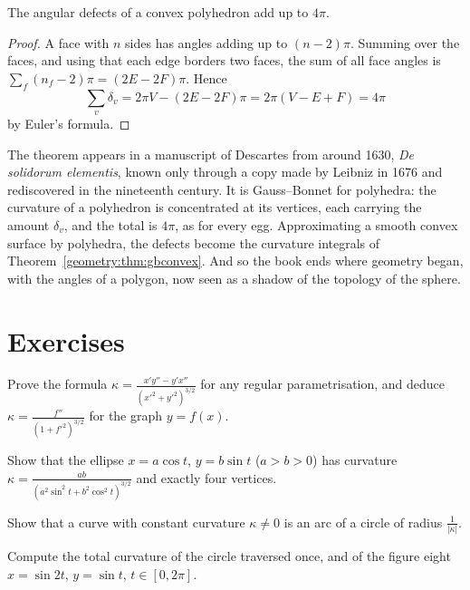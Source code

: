 \begin{theorem}[Descartes]\label{geometry:thm:descartesdefect}
The angular defects of a convex polyhedron add up to $4\pi$.
\end{theorem}

\begin{proof}
A face with $n$ sides has angles adding up to $(n-2)\pi$. Summing over the faces, and using that each edge borders two faces, the sum of all face angles is
$\sum_f(n_f-2)\pi=(2E-2F)\pi$. Hence
\[
\sum_v\delta_v=2\pi V-(2E-2F)\pi=2\pi(V-E+F)=4\pi
\]
by Euler's formula.
\end{proof}

The theorem appears in a manuscript of Descartes from around 1630, \emph{De solidorum elementis}, known only through a copy made by Leibniz in 1676 and rediscovered
in the nineteenth century. It is Gauss--Bonnet for polyhedra: the curvature of a polyhedron is concentrated at its vertices, each carrying the amount $\delta_v$,
and the total is $4\pi$, as for every egg. Approximating a smooth convex surface by polyhedra, the defects become the curvature integrals of
Theorem~\ref{geometry:thm:gbconvex}. And so the book ends where geometry began, with the angles of a polygon, now seen as a shadow of the topology of the sphere.

\section{Exercises}

\begin{exercise}[$\star$]\label{geometry:ex:graphcurv}
Prove the formula $\kappa=\frac{x'y''-y'x''}{(x'^2+y'^2)^{3/2}}$ for any regular parametrisation, and deduce $\kappa=\frac{f''}{(1+f'^2)^{3/2}}$ for the graph $y=f(x)$.
\end{exercise}

\begin{exercise}[$\star$]\label{geometry:ex:ellipsevertex}
Show that the ellipse $x=a\cos t$, $y=b\sin t$ ($a>b>0$) has curvature $\kappa=\frac{ab}{(a^2\sin^2t+b^2\cos^2t)^{3/2}}$ and exactly four vertices.
\end{exercise}

\begin{exercise}[$\star$]\label{geometry:ex:constcurv}
Show that a curve with constant curvature $\kappa\ne0$ is an arc of a circle of radius $\frac1{|\kappa|}$.
\end{exercise}

\begin{exercise}[$\star$]\label{geometry:ex:totalcurv}
Compute the total curvature of the circle traversed once, and of the figure eight $x=\sin2t$, $y=\sin t$, $t\in[0,2\pi]$.
\end{exercise}

